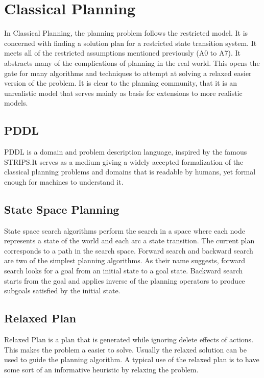 \documentclass
[a4paper
,english
,parskip=half
,bibliography=totoc
]{scrreprt}
\begin{document}
    \section{Classical Planning} \label{classical_planning}
    In Classical Planning, the planning problem follows the restricted model. It is concerned with finding a solution plan for a restricted state transition system. It meets all of the restricted assumptions mentioned previously (A0 to A7). It abstracts many of the complications of planning in the real world. This opens the gate for many algorithms and techniques to attempt at solving a relaxed easier version of the problem. It is clear to the planning community, that it is an unrealistic model that serves mainly as basis for extensions to more realistic models.
       
        \subsection{PDDL}
        PDDL is a domain and problem description language, inspired by the famous STRIPS.It serves as a medium giving a widely accepted formalization of the classical planning problems and domains that is readable by humans, yet formal enough for machines to understand it. \citep{AICPub1821:1998} 

        \subsection{State Space Planning}
        State space search algorithms perform the search in a space where each node represents a state of the world and each arc a state transition. The current plan corresponds to a path in the search space.
        Forward search and backward search are two of the simplest planning algorithms. As their name suggests, forward search looks for a goal from an initial state to a goal state. Backward search starts from the goal and applies inverse of the planning operators to produce subgoals satisfied by the initial state. \citep{automated_planning}

        \subsection{Relaxed Plan}
        Relaxed Plan is a plan that is generated while ignoring delete effects of actions. This makes the problem a easier to solve. Usually the relaxed solution can be used to guide the planning algorithm. A typical use of the relaxed plan is to have some sort of an informative heuristic by relaxing the problem. \citep{automated_planning}
\end{document}

